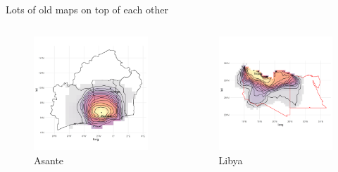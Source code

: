 \documentclass{beamer}
\begin{document}
\begin{frame}{Lots of old maps on top of each other}

	\begin{columns}


		\begin{figure}[htpb]
			\centering
			\includegraphics[width=0.8\linewidth]{img/asante.png}
			\caption{Asante}
		\end{figure}


		\begin{figure}[htpb]
			\centering
			\includegraphics[width=0.8\linewidth]{img/libya.png}
			\caption{Libya}
		\end{figure}

	\end{columns}

\end{frame}
\end{document}
